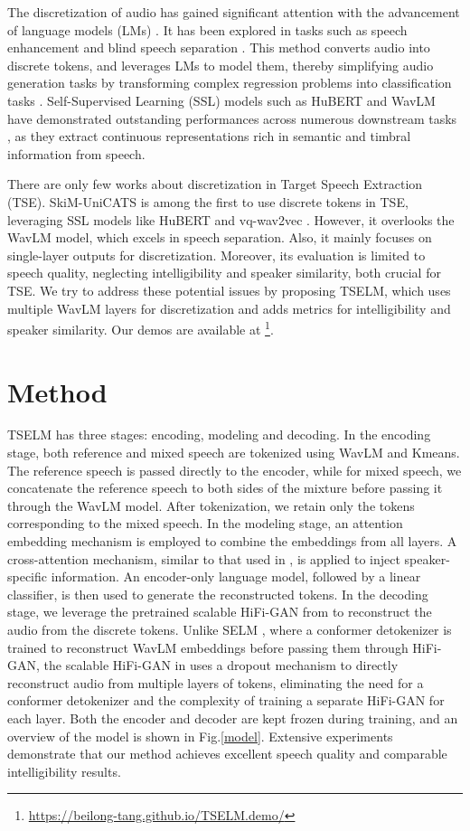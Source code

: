 \documentclass[conference]{IEEEtran}
\begin{document}
The discretization of audio has gained significant attention with the advancement of language models (LMs) \cite{l1, l2, l3, l4, l5}. It has been explored in
tasks such as speech enhancement \cite{selm} and blind speech separation \cite{dasb,tokensplit}.
This method converts audio into discrete tokens, and leverages LMs to model them, thereby simplifying audio generation tasks by transforming complex regression problems into classification tasks \cite{dasb}. Self-Supervised Learning (SSL) models such as HuBERT \cite{hubert} and WavLM \cite{wavlm} have demonstrated outstanding performances across numerous downstream tasks \cite{superb}, as they extract continuous representations rich in semantic and timbral information from speech.

There are only few works about discretization in Target Speech Extraction (TSE). SkiM-UniCATS \cite{gen_tse} is among the first to use discrete tokens in TSE, leveraging SSL models like HuBERT and vq-wav2vec \cite{vq_wav2vec}. However, it overlooks the WavLM model, which excels in speech separation. Also, it mainly focuses on single-layer outputs for discretization. Moreover, its evaluation is limited to speech quality, neglecting intelligibility and speaker similarity, both crucial for TSE. We try to address these potential issues by proposing TSELM, which uses multiple WavLM layers for discretization and adds metrics for intelligibility and speaker similarity. Our demos are available at 
\footnote{\href{https://beilong-tang.github.io/TSELM.demo/}{https://beilong-tang.github.io/TSELM.demo/}}.


\section{Method}
TSELM has three stages: encoding, modeling and decoding. In the encoding stage, both reference and mixed speech are tokenized using WavLM and Kmeans. The reference speech is passed directly to the encoder, while for mixed speech, we concatenate the reference speech to both sides of the mixture before passing it through the WavLM model. After tokenization, we retain only the tokens corresponding to the mixed speech.
In the modeling stage, an attention embedding mechanism is employed to combine the embeddings from all layers. A cross-attention mechanism, similar to that used in \cite{usef_tes}, is applied to inject speaker-specific information. An encoder-only language model, followed by a linear classifier, is then used to generate the reconstructed tokens.
In the decoding stage, we leverage the pretrained scalable HiFi-GAN from \cite{unit_hifi} to reconstruct the audio from the discrete tokens. Unlike SELM \cite{selm}, where a conformer detokenizer is trained to reconstruct WavLM embeddings before passing them through HiFi-GAN, the scalable HiFi-GAN in \cite{unit_hifi} uses a dropout mechanism to directly reconstruct audio from multiple layers of tokens, eliminating the need for a conformer detokenizer and the complexity of training a separate HiFi-GAN for each layer. Both the encoder and decoder are kept frozen during training, and an overview of the model is shown in Fig.\ref{model}.
Extensive experiments demonstrate that our method achieves excellent speech quality and comparable intelligibility results.
\end{document}
